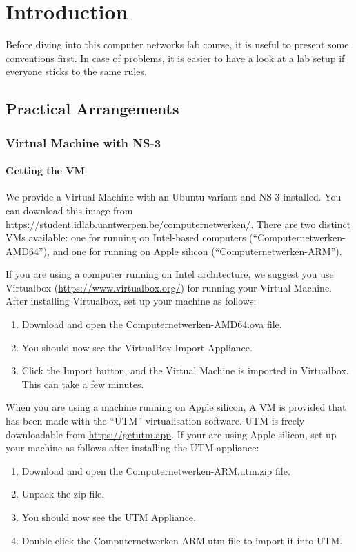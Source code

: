 
\setcounter{chapter}{6}
\chapter*{Introduction}

Before diving into this computer networks lab course, it is useful to present some conventions first.  In case of problems, it is easier to have a look at a lab setup if everyone sticks to the same rules.

\section{Practical Arrangements}

\subsection{Virtual Machine with NS-3}

\subsubsection{Getting the VM}
We provide a Virtual Machine with an Ubuntu variant and NS-3 installed. You can download this image from \url{https://student.idlab.uantwerpen.be/computernetwerken/}. There are two distinct VMs available: one for running on Intel-based computers (``Computernetwerken-AMD64''), and one for running on Apple silicon (``Computernetwerken-ARM'').

If you are using a computer running on Intel architecture, we suggest you use Virtualbox (\url{https://www.virtualbox.org/}) for running your Virtual Machine. After installing Virtualbox, set up your machine as follows:
\begin{enumerate}
\item Download and open the Computernetwerken-AMD64.ova file.
\item You should now see the VirtualBox Import Appliance.
\item Click the Import button, and the Virtual Machine is imported in Virtualbox. This can take a few minutes.
\end{enumerate}

When you are using a machine running on Apple silicon, A VM is provided that has been made with the ``UTM'' virtualisation software. UTM is freely downloadable from \url{https://getutm.app}. If your are using Apple silicon, set up your machine as follows after installing the UTM appliance:
\begin{enumerate}
	\item Download and open the Computernetwerken-ARM.utm.zip file.
	\item Unpack the zip file.
	\item You should now see the UTM Appliance.
	\item Double-click the Computernetwerken-ARM.utm file to import it into UTM.
	\end{enumerate}

